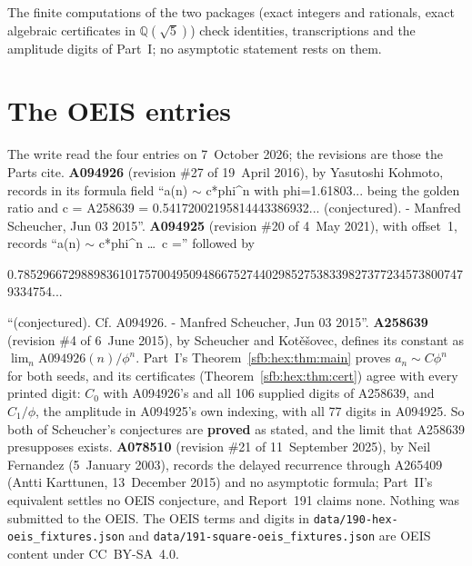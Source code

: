 \documentclass[11pt]{article}
\theoremstyle{remark}\newtheorem{remark}[theorem]{Remark}
\newcommand{\file}[1]{\nolinkurl{#1}}
\begin{document}
The finite computations of the two packages (exact integers and rationals,
exact algebraic certificates in $\mathbb Q(\sqrt5)$) check identities,
transcriptions and the amplitude digits of Part~I; no asymptotic statement
rests on them.

\section*{The OEIS entries}\label{sfb:sec:oeis}
The write read the four entries on 7~October 2026; the revisions are those
the Parts cite. \textbf{A094926} \cite{oeis926} (revision \#27 of
19~April 2016), by Yasutoshi Kohmoto, records in its formula field ``a(n)
$\sim$ c*phi\^{}n with phi=1.61803... being the golden ratio and c = A258639
= 0.54172002195814443386932... (conjectured). - Manfred Scheucher, Jun 03
2015''. \textbf{A094925} \cite{oeis925} (revision \#20 of 4~May 2021), with
offset~1, records ``a(n) $\sim$ c*phi\^{}n \dots\ c ='' followed by
\begin{center}\small
0.78529667298898361017570049509486675274402985275383398273772345738007479334754...
\end{center}
``(conjectured). Cf. A094926. - Manfred Scheucher, Jun 03 2015''.
\textbf{A258639} \cite{oeis639} (revision \#4 of 6~June 2015), by Scheucher
and Kot\v{e}\v{s}ovec, defines its constant as $\lim_n\mathrm{A094926}(n)/\phi^n$.
Part~I's Theorem~\ref{sfb:hex:thm:main} proves $a_n\sim C\phi^n$ for both
seeds, and its certificates (Theorem~\ref{sfb:hex:thm:cert}) agree with every
printed digit: $C_0$ with A094926's and all 106 supplied digits of A258639,
and $C_1/\phi$, the amplitude in A094925's own indexing, with all 77 digits
in A094925. So both of Scheucher's conjectures are \textbf{proved} as stated,
and the limit that A258639 presupposes exists. \textbf{A078510}
\cite{oeis510} (revision \#21 of 11~September 2025), by Neil Fernandez
(5~January 2003), records the delayed recurrence through A265409 (Antti
Karttunen, 13~December 2015) and no asymptotic formula; Part~II's
equivalent settles no OEIS conjecture, and Report~191 claims none.
Nothing was submitted to the OEIS. The OEIS terms and digits in
\file{data/190-hex-oeis_fixtures.json} and
\file{data/191-square-oeis_fixtures.json} are OEIS content under
CC~BY-SA~4.0.
\end{document}

